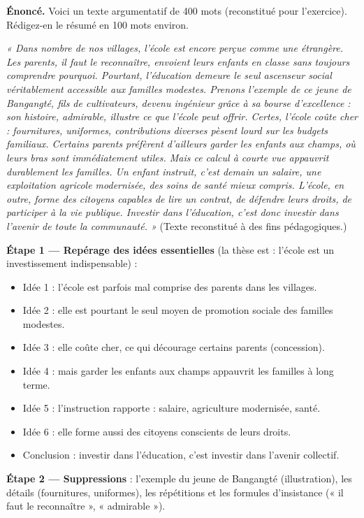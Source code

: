 \documentclass[11pt]{article}
\begin{document}
\begin{exoresolu}
\textbf{Énoncé.} Voici un texte argumentatif de 400 mots (reconstitué pour l'exercice). Rédigez-en le résumé en 100 mots environ.

\smallskip
\emph{« Dans nombre de nos villages, l'école est encore perçue comme une étrangère. Les parents, il faut le reconnaître, envoient leurs enfants en classe sans toujours comprendre pourquoi. Pourtant, l'éducation demeure le seul ascenseur social véritablement accessible aux familles modestes. Prenons l'exemple de ce jeune de Bangangté, fils de cultivateurs, devenu ingénieur grâce à sa bourse d'excellence : son histoire, admirable, illustre ce que l'école peut offrir. Certes, l'école coûte cher : fournitures, uniformes, contributions diverses pèsent lourd sur les budgets familiaux. Certains parents préfèrent d'ailleurs garder les enfants aux champs, où leurs bras sont immédiatement utiles. Mais ce calcul à courte vue appauvrit durablement les familles. Un enfant instruit, c'est demain un salaire, une exploitation agricole modernisée, des soins de santé mieux compris. L'école, en outre, forme des citoyens capables de lire un contrat, de défendre leurs droits, de participer à la vie publique. Investir dans l'éducation, c'est donc investir dans l'avenir de toute la communauté. »} (Texte reconstitué à des fins pédagogiques.)

\smallskip
\tcblower
\textbf{Étape 1 — Repérage des idées essentielles} (la thèse est : l'école est un investissement indispensable) :
\begin{itemize}
\item Idée 1 : l'école est parfois mal comprise des parents dans les villages.
\item Idée 2 : elle est pourtant le seul moyen de promotion sociale des familles modestes.
\item Idée 3 : elle coûte cher, ce qui décourage certains parents (concession).
\item Idée 4 : mais garder les enfants aux champs appauvrit les familles à long terme.
\item Idée 5 : l'instruction rapporte : salaire, agriculture modernisée, santé.
\item Idée 6 : elle forme aussi des citoyens conscients de leurs droits.
\item Conclusion : investir dans l'éducation, c'est investir dans l'avenir collectif.
\end{itemize}
\textbf{Étape 2 — Suppressions} : l'exemple du jeune de Bangangté (illustration), les détails (fournitures, uniformes), les répétitions et les formules d'insistance (« il faut le reconnaître », « admirable »).


\end{exoresolu}
\end{document}
